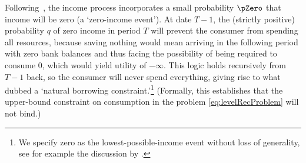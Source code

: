 \documentclass[BufferStockTheory]{subfiles}
\begin{document}
Following~\cite{zeldesStochastic}, the income process incorporates a small probability $\pZero$ that income will be zero (a `zero-income event').  At date $T-1$, the (strictly positive) probability $q$ of zero income in period $T$ will prevent the consumer from spending all resources, because saving nothing would mean arriving in the following period with zero bank balances and thus facing the possibility of being required to consume 0, which would yield utility of $-\infty$. This logic holds recursively from $T-1$ back, so  the consumer will never spend everything, giving rise to what \cite{aiyagari:ge} dubbed a `natural borrowing constraint.'\footnote{We specify zero as the lowest-possible-income event without loss of generality, see for example the discussion by \cite{aiyagari:ge}.} (Formally, this establishes that the upper-bound constraint on consumption in the problem \eqref{eq:levelRecProblem} will not bind.)

\hypertarget{PDV}{}

\begin{comment}
we do not need the below?
The model looks more special than it is. In particular, a positive probability of zero-income events may seem objectionable (despite empirical support). However, a nonzero minimum value of $\tranShkAll$ (motivated, say, by the existence of unemployment insurance) could be handled by capitalizing the present discounted value (PDV) of minimum income into current market assets,\footnote{So long as unemployment benefits are proportional to $\permLvl_{t}$; see the discussion in Section~\ref{sec:discussConvergence}.} and transforming that model back into this one.  And no key results would change if the transitory shocks were persistent but mean-reverting (instead of iid).\@ Also, the assumption of a positive point mass for the worst realization of the transitory shock is inessential, but simplifies the proofs and is a powerful aid to intuition.
\end{comment}

\begin{comment}
Following footnotes and text were removed from the discussion above

\footnote{We calibrate this probability to 0.005 to match data from the Panel Study of Income Dynamics (\cite{carrollBrookings}).}

\footnote{\cite{rabaultBorrowing} and~\cite{lsIncFluct} analyze cases where the shock processes have unbounded support.} 

and when $\permShkIndMin=\permShkIndMax=1$ the model becomes the degenerate case with no permanent shocks
\end{comment}
\end{document}
